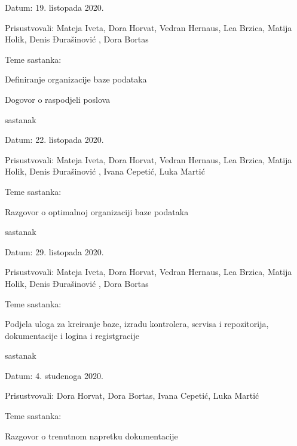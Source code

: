 \begin{packed_enum}
			\item[] \begin{packed_item}
				\item Datum: 19. listopada 2020.
				\item Prisustvovali: Mateja Iveta, Dora Horvat, Vedran Hernaus, Lea Brzica, Matija Holik, Denis Đurašinović , Dora Bortas
				\item Teme sastanka:
				\begin{packed_item}
					\item Definiranje organizacije baze podataka
					\item Dogovor o raspodjeli poslova
				\end{packed_item}
			\end{packed_item}
		
			
				\item  sastanak
				
				\item[] \begin{packed_item}
					\item Datum: 22. listopada 2020.
					\item Prisustvovali: Mateja Iveta, Dora Horvat, Vedran Hernaus, Lea Brzica, Matija Holik, Denis Đurašinović , Ivana Cepetić, Luka Martić
					\item Teme sastanka:
					\begin{packed_item}
						\item Razgovor o optimalnoj organizaciji baze podataka
					\end{packed_item}
				\end{packed_item}
				\item  sastanak
			
			\item[] \begin{packed_item}
				\item Datum: 29. listopada 2020.
				\item Prisustvovali: Mateja Iveta, Dora Horvat, Vedran Hernaus, Lea Brzica, Matija Holik, Denis Đurašinović , Dora Bortas
				\item Teme sastanka:
				\begin{packed_item}
					\item Podjela uloga za kreiranje baze, izradu kontrolera, servisa i repozitorija, dokumentacije i logina i registgracije
				\end{packed_item}
			\end{packed_item}
		 \item sastanak
		\item[] \begin{packed_item}
			\item Datum: 4. studenoga 2020.
			\item Prisustvovali:  Dora Horvat, Dora Bortas, Ivana Cepetić, Luka Martić
			\item Teme sastanka:
			\begin{packed_item}
				\item Razgovor o trenutnom napretku dokumentacije
				

\end{packed_item}
\end{packed_item}
\end{packed_enum}
